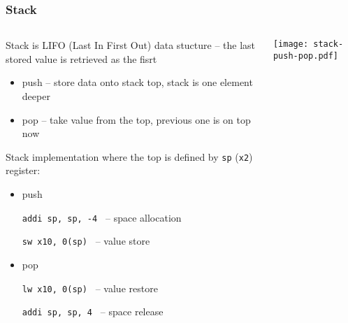 \documentclass{beamer}
\begin{document}
\begin{frame}
\frametitle{Stack}

\begin{columns}
\begin{column}{0.7\textwidth}
Stack is LIFO (Last In First Out) data stucture -- the last stored value is retrieved as the fisrt
\begin{itemize}
 \item push -- store data onto stack top, stack is one element deeper
 \item pop -- take value from the top, previous one is on top now
\end{itemize}

Stack implementation where the top is defined by \texttt{sp} (\texttt{x2}) register:
\begin{itemize}
 \item push 
 
\texttt{addi sp, sp, -4 \phantom{xx}}  -- space allocation

\texttt{sw \phantom{xx}x10, 0(sp) \phantom{xx}}  -- value store
 
 \item pop

\texttt{lw \phantom{xx}x10, 0(sp) \phantom{xx}}  -- value restore

\texttt{addi sp, sp, 4 \phantom{xxx}}  -- space release

\end{itemize}

\end{column}
\hfill
\begin{column}{0.3\textwidth}  
\texttt{[image: stack-push-pop.pdf]}
\end{column}
\end{columns}

\end{frame}
\end{document}
